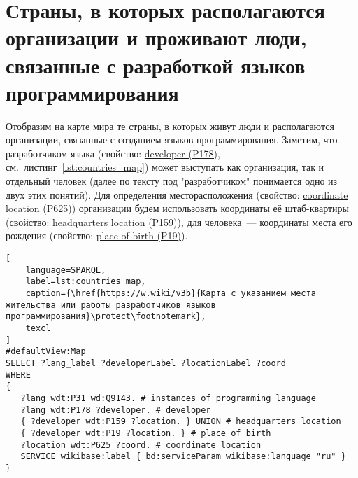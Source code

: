 \section{Страны, в которых располагаются организации и проживают люди, связанные с разработкой языков программирования}

Отобразим на карте мира те страны, в которых живут люди и располагаются организации, связанные с созданием языков программирования. Заметим, что разработчиком языка (свойство: \href{https://www.wikidata.org/wiki/Property:P178}{developer (P178)}, см.~листинг~\ref{lst:countries_map}) может выступать как организация, так и отдельный человек (далее по тексту под "разработчиком" понимается одно из двух этих понятий). Для определения месторасположения (свойство: \href{https://www.wikidata.org/wiki/Property:P625}{coordinate location (P625)}) организации будем использовать координаты её штаб-квартиры (свойство: \href{https://www.wikidata.org/wiki/Property:P159}{headquarters location (P159)}), для человека~--- координаты места его рождения (свойство: \href{https://www.wikidata.org/wiki/Property:P19}{place of birth (P19)}).

\begin{lstlisting}[
	language=SPARQL,
	label=lst:countries_map,
	caption={\href{https://w.wiki/v3b}{Карта с указанием места жительства или работы разработчиков языков программирования}\protect\footnotemark},
	texcl
]
#defaultView:Map
SELECT ?lang_label ?developerLabel ?locationLabel ?coord
WHERE
{
   ?lang wdt:P31 wd:Q9143. # instances of programming language
   ?lang wdt:P178 ?developer. # developer
   { ?developer wdt:P159 ?location. } UNION # headquarters location
   { ?developer wdt:P19 ?location. } # place of birth
   ?location wdt:P625 ?coord. # coordinate location
   SERVICE wikibase:label { bd:serviceParam wikibase:language "ru" } 	
}
\end{lstlisting}


